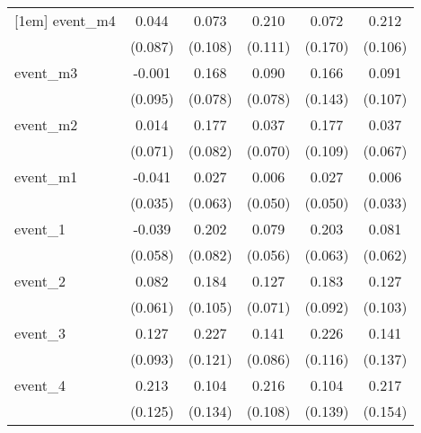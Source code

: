 {\begin{tabular}{l*{5}{c}}
[1em]
event\_m4    &       0.044         &       0.073         &       0.210         &       0.072         &       0.212\sym{*}  \\
            &     (0.087)         &     (0.108)         &     (0.111)         &     (0.170)         &     (0.106)         \\
[1em]
event\_m3    &      -0.001         &       0.168\sym{*}  &       0.090         &       0.166         &       0.091         \\
            &     (0.095)         &     (0.078)         &     (0.078)         &     (0.143)         &     (0.107)         \\
[1em]
event\_m2    &       0.014         &       0.177\sym{*}  &       0.037         &       0.177         &       0.037         \\
            &     (0.071)         &     (0.082)         &     (0.070)         &     (0.109)         &     (0.067)         \\
[1em]
event\_m1    &      -0.041         &       0.027         &       0.006         &       0.027         &       0.006         \\
            &     (0.035)         &     (0.063)         &     (0.050)         &     (0.050)         &     (0.033)         \\
[1em]
event\_1     &      -0.039         &       0.202\sym{*}  &       0.079         &       0.203\sym{**} &       0.081         \\
            &     (0.058)         &     (0.082)         &     (0.056)         &     (0.063)         &     (0.062)         \\
[1em]
event\_2     &       0.082         &       0.184         &       0.127         &       0.183\sym{*}  &       0.127         \\
            &     (0.061)         &     (0.105)         &     (0.071)         &     (0.092)         &     (0.103)         \\
[1em]
event\_3     &       0.127         &       0.227         &       0.141         &       0.226         &       0.141         \\
            &     (0.093)         &     (0.121)         &     (0.086)         &     (0.116)         &     (0.137)         \\
[1em]
event\_4     &       0.213         &       0.104         &       0.216\sym{*}  &       0.104         &       0.217         \\
            &     (0.125)         &     (0.134)         &     (0.108)         &     (0.139)         &     (0.154)         \\

\end{tabular}}
